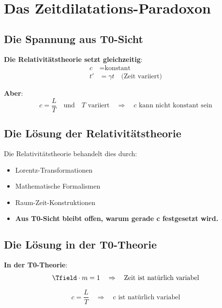 	\section{Das Zeitdilatations-Paradoxon}
	
	\subsection{Die Spannung aus T0-Sicht}
	
	\textbf{Die Relativitätstheorie setzt gleichzeitig}:
	\begin{align}
		c &= \text{konstant} \\
		t' &= \gamma t \quad \text{(Zeit variiert)}
	\end{align}
	
	\textbf{Aber}:
	\begin{equation}
		c = \frac{L}{T} \quad \text{und} \quad T \text{ variiert} \quad \Rightarrow \quad c \text{ kann nicht konstant sein}
	\end{equation}
	
	\subsection{Die Lösung der Relativitätstheorie}
	
	Die Relativitätstheorie behandelt dies durch:
	\begin{itemize}
		\item Lorentz-Transformationen
		\item Mathematische Formalismen
		\item Raum-Zeit-Konstruktionen
		\item \textbf{Aus T0-Sicht bleibt offen, warum gerade c festgesetzt wird.}
	\end{itemize}
	
	\subsection{Die Lösung in der T0-Theorie}
	
	\textbf{In der T0-Theorie}:
	\begin{equation}
		\Tfield \cdot m = 1 \quad \Rightarrow \quad \text{Zeit ist natürlich variabel}
	\end{equation}
	
	\begin{equation}
		c = \frac{L}{T} \quad \Rightarrow \quad \text{c ist natürlich variabel}
	\end{equation}
	
